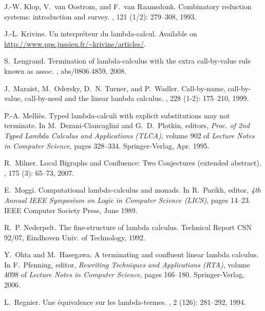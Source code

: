 \documentclass{LMCS}
\renewcommand{\>}{\rightarrow}
\begin{document}
\begin{thebibliography}{10}
J.-W. Klop, V.~van Oostrom, and F.~van Raamsdonk.
\newblock Combinatory reduction systems: introduction and survey.
, 121 (1/2):
  279--308, 1993.

J.-L. Krivine.
\newblock Un interpr\'eteur du lambda-calcul.
\newblock Available on \url{http://www.pps.jussieu.fr/~krivine/articles/}.

S.~Lengrand.
\newblock Termination of lambda-calculus with the extra call-by-value rule
  known as assoc.
, abs/0806.4859, 2008.

J.~Maraist, M.~Odersky, D.~N. Turner, and P.~Wadler.
\newblock Call-by-name, call-by-value, call-by-need and the linear lambda
  calculus.
, 228 (1-2):
  175--210, 1999.

P.-A. Melli\`es.
\newblock Typed lambda-calculi with explicit substitutions may not terminate.
\newblock In M.~Dezani-Ciancaglini and
               G.~D.~Plotkin, editors, {\em Proc. of 2nd Typed Lambda Calculus and Applications (TLCA)},
  volume 902 of {\em Lecture Notes in Computer Science}, pages 328--334.
  Springer-Verlag, Apr. 1995.

R.~Milner.
\newblock Local {B}igraphs and {C}onfluence: {T}wo {C}onjectures (extended
  abstract).
,
  175 (3): 65--73, 2007.

E.~Moggi.
\newblock Computational lambda-calculus and monads.
\newblock In R.~Parikh, editor, {\em 4th Annual {IEEE} Symposium on Logic in
  Computer Science (LICS)}, pages 14--23. IEEE Computer Society Press, June
  1989.

R.~P. Nederpelt.
\newblock The fine-structure of lambda calculus.
\newblock Technical Report CSN 92/07, Eindhoven Univ. of Technology, 1992.

Y.~Ohta and M.~Hasegawa.
\newblock A terminating and confluent linear lambda calculus.
\newblock In F.~Pfenning, editor, {\em Rewriting Techniques and Applications
  (RTA)}, volume 4098 of {\em Lecture Notes in Computer Science}, pages
  166--180. Springer-Verlag, 2006.

L.~Regnier.
\newblock Une \'equivalence sur les lambda-termes.
, 2 (126):
  281--292, 1994.


\end{thebibliography}
\end{document}
